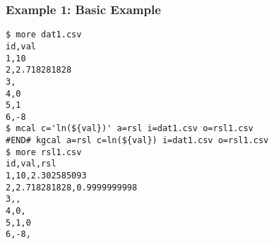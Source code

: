 \subsubsection*{Example 1: Basic Example}



\begin{Verbatim}[baselinestretch=0.7,frame=single]
$ more dat1.csv
id,val
1,10
2,2.718281828
3,
4,0
5,1
6,-8
$ mcal c='ln(${val})' a=rsl i=dat1.csv o=rsl1.csv
#END# kgcal a=rsl c=ln(${val}) i=dat1.csv o=rsl1.csv
$ more rsl1.csv
id,val,rsl
1,10,2.302585093
2,2.718281828,0.9999999998
3,,
4,0,
5,1,0
6,-8,
\end{Verbatim}
